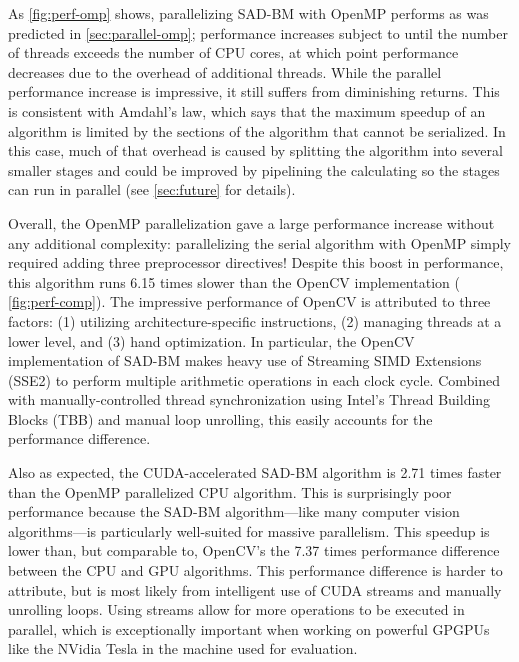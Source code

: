 \documentclass{article}
\let\orgautoref\autoref
\providecommand{\Autoref}
        {\def\equationautorefname{Equation}%
         \def\figureautorefname{Figure}%
         \def\subfigureautorefname{Figure}%
         \def\Itemautorefname{Item}%
         \def\tableautorefname{Table}%
         \def\sectionautorefname{Section}%
         \def\subsectionautorefname{Section}%
         \def\subsubsectionautorefname{Section}%
         \def\chapterautorefname{Section}%
         \def\partautorefname{Part}%
         \orgautoref}
\begin{document}
As \Autoref{fig:perf-omp} shows, parallelizing SAD-BM with OpenMP performs as
was predicted in \Autoref{sec:parallel-omp}; performance increases subject to
until the number of threads exceeds the number of CPU cores, at which point
performance decreases due to the overhead of additional threads. While the
parallel performance increase is impressive, it still suffers from diminishing
returns. This is consistent with Amdahl's law, which says that the maximum
speedup of an algorithm is limited by the sections of the algorithm that cannot
be serialized. In this case, much of that overhead is caused by splitting the
algorithm into several smaller stages and could be improved by pipelining the
calculating so the stages can run in parallel (see \Autoref{sec:future} for
details).

Overall, the OpenMP parallelization gave a large performance increase without
any additional complexity: parallelizing the serial algorithm with OpenMP
simply required adding three preprocessor directives! Despite this boost in
performance, this algorithm runs 6.15 times slower than the OpenCV
implementation (\Autoref{fig:perf-comp}). The impressive performance of OpenCV
is attributed to three factors: (1) utilizing architecture-specific
instructions, (2) managing threads at a lower level, and (3) hand optimization.
In particular, the OpenCV implementation of SAD-BM makes heavy use of Streaming
SIMD Extensions (SSE2) to perform multiple arithmetic operations in each clock
cycle. Combined with manually-controlled thread synchronization using Intel's
Thread Building Blocks (TBB) and manual loop unrolling, this easily accounts
for the performance difference.

Also as expected, the CUDA-accelerated SAD-BM algorithm is 2.71 times faster
than the OpenMP parallelized CPU algorithm. This is surprisingly poor
performance because the SAD-BM algorithm---like many computer vision
algorithms---is particularly well-suited for massive parallelism. This speedup
is lower than, but comparable to, OpenCV's the 7.37 times performance
difference between the CPU and GPU algorithms. This performance difference is
harder to attribute, but is most likely from intelligent use of CUDA streams
and manually unrolling loops. Using streams allow for more operations to be
executed in parallel, which is exceptionally important when working on powerful
GPGPUs like the NVidia Tesla in the machine used for evaluation.
\end{document}
